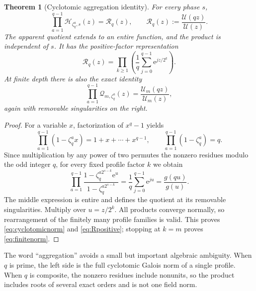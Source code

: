 \documentclass[11pt,letterpaper]{article}
\numberwithin{equation}{section}
\newtheorem{theorem}{Theorem}[section]
\theoremstyle{definition}
\theoremstyle{remark}
\newcommand{\Up}{\mathcal U}
\newcommand{\Rp}{\mathcal R}
\newcommand{\Hp}{\mathcal H}
\newcommand{\Qp}{\mathcal Q}
\newcommand{\e}{\mathrm e}
\begin{document}
\begin{theorem}[Cyclotomic aggregation identity]
\label{thm:norm}
For every phase \(s\),
\begin{equation}
 \prod_{a=1}^{q-1}\Hp_{\zeta_q^a,s}(z)
 =\Rp_q(z),\qquad
 \Rp_q(z):=\frac{\Up(qz)}{\Up(z)}.
 \label{eq:cyclotomicnorm}
\end{equation}
The apparent quotient extends to an entire function, and the product is independent of \(s\). It has the positive-factor representation
\begin{equation}
 \Rp_q(z)=\prod_{k\geq1}
       \left(\frac1q\sum_{j=0}^{q-1}\e^{jz/2^k}\right).
 \label{eq:Rpositive}
\end{equation}
At finite depth there is also the exact identity
\begin{equation}
 \prod_{a=1}^{q-1}\Qp_{m,\zeta_q^a}(z)
 =\frac{\Up_m(qz)}{\Up_m(z)},
 \label{eq:finitenorm}
\end{equation}
again with removable singularities on the right.
\end{theorem}
\begin{proof}
For a variable \(x\), factorization of \(x^q-1\) yields
\[
 \prod_{a=1}^{q-1}(1-\zeta_q^a x)=1+x+\cdots+x^{q-1},
 \qquad \prod_{a=1}^{q-1}(1-\zeta_q^a)=q.
\]
Since multiplication by any power of two permutes the nonzero residues modulo the odd integer \(q\), for every fixed profile factor \(k\) we obtain
\[
 \prod_{a=1}^{q-1}
 \frac{1-\zeta_q^{a2^{s-k}}\e^u}{1-\zeta_q^{a2^{s-k}}}
 =\frac1q\sum_{j=0}^{q-1}\e^{ju}
 =\frac{g(qu)}{g(u)}.
\]
The middle expression is entire and defines the quotient at its removable singularities. Multiply over \(u=z/2^k\). All products converge normally, so rearrangement of the finitely many profile families is valid. This proves \eqref{eq:cyclotomicnorm} and \eqref{eq:Rpositive}; stopping at \(k=m\) proves \eqref{eq:finitenorm}.
\end{proof}

The word ``aggregation'' avoids a small but important algebraic ambiguity. When \(q\) is prime, the left side is the full cyclotomic Galois norm of a single profile. When \(q\) is composite, the nonzero residues include nonunits, so the product includes roots of several exact orders and is not one field norm.
\end{document}
